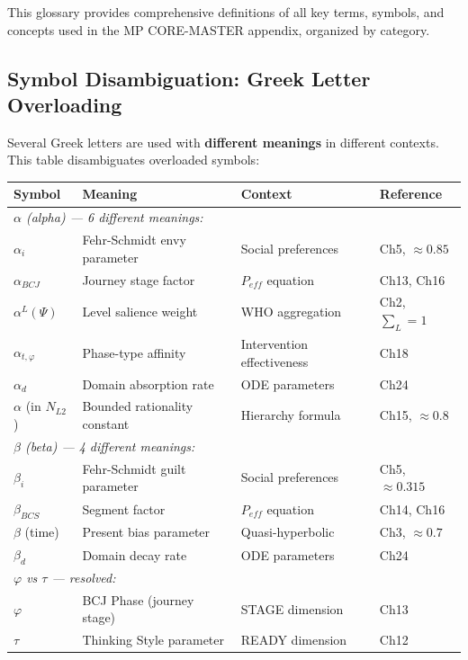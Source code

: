 This glossary provides comprehensive definitions of all key terms, symbols, and concepts
used in the MP CORE-MASTER appendix, organized by category.

\subsection{Symbol Disambiguation: Greek Letter Overloading}
\label{sec:mp-symbol-disambiguation}

\begin{tcolorbox}[colback=yellow!5!white, colframe=yellow!75!black,
    title=\textbf{IMPORTANT: Symbol Disambiguation}]

Several Greek letters are used with \textbf{different meanings} in different contexts.
This table disambiguates overloaded symbols:

\begin{center}
\renewcommand{\arraystretch}{1.3}
\begin{tabular}{@{}llll@{}}
\toprule
\textbf{Symbol} & \textbf{Meaning} & \textbf{Context} & \textbf{Reference} \\
\midrule
\multicolumn{4}{l}{\textit{$\alpha$ (alpha) --- 6 different meanings:}} \\
$\alpha_i$ & Fehr-Schmidt envy parameter & Social preferences & Ch5, $\approx 0.85$ \\
$\alpha_{BCJ}$ & Journey stage factor & $P_{eff}$ equation & Ch13, Ch16 \\
$\alpha^L(\Psi)$ & Level salience weight & WHO aggregation & Ch2, $\sum_L = 1$ \\
$\alpha_{t,\varphi}$ & Phase-type affinity & Intervention effectiveness & Ch18 \\
$\alpha_d$ & Domain absorption rate & ODE parameters & Ch24 \\
$\alpha$ (in $N_{L2}$) & Bounded rationality constant & Hierarchy formula & Ch15, $\approx 0.8$ \\
\midrule
\multicolumn{4}{l}{\textit{$\beta$ (beta) --- 4 different meanings:}} \\
$\beta_i$ & Fehr-Schmidt guilt parameter & Social preferences & Ch5, $\approx 0.315$ \\
$\beta_{BCS}$ & Segment factor & $P_{eff}$ equation & Ch14, Ch16 \\
$\beta$ (time) & Present bias parameter & Quasi-hyperbolic & Ch3, $\approx 0.7$ \\
$\beta_d$ & Domain decay rate & ODE parameters & Ch24 \\
\midrule
\multicolumn{4}{l}{\textit{$\varphi$ vs $\tau$ --- resolved:}} \\
$\varphi$ & BCJ Phase (journey stage) & STAGE dimension & Ch13 \\
$\tau$ & Thinking Style parameter & READY dimension & Ch12 \\
\bottomrule
\end{tabular}
\end{center}


\end{tcolorbox}
